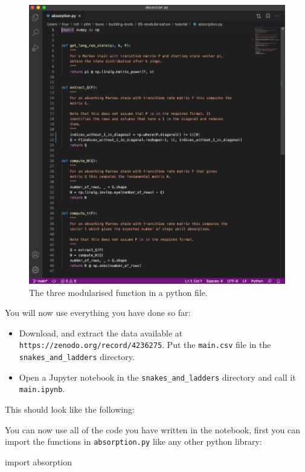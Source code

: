 \begin{figure}[htbp]
\centering
    \includegraphics[width=.7\textwidth]{assets/absorption/main.png}
    \caption{The three modularised function in a python file.}
    \label{fig:absorption.py}
\end{figure}


You will now use everything you have done so far:
\begin{itemize}
\item 

Download, and extract the data available at
\texttt{https://zenodo.org/record/4236275}. Put the
\texttt{main.csv} file in the \texttt{snakes\_and\_ladders}
directory.

\item 

Open a Jupyter notebook in the 
\texttt{snakes\_and\_ladders} directory
and call it \texttt{main.ipynb}.

\end{itemize}


This should look like the following:

\begin{center}
\end{center}


You can now use all of the code you have written in the notebook, first you can
import the functions in \texttt{absorption.py} like any other python library:

\begin{pyin}
import absorption
\end{pyin}

